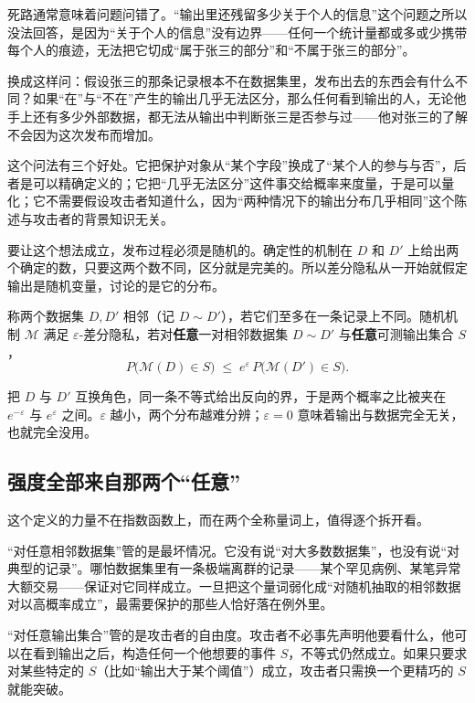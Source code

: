死路通常意味着问题问错了。``输出里还残留多少关于个人的信息''这个问题之所以没法回答，是因为``关于个人的信息''没有边界——任何一个统计量都或多或少携带每个人的痕迹，无法把它切成``属于张三的部分''和``不属于张三的部分''。

换成这样问：假设张三的那条记录根本不在数据集里，发布出去的东西会有什么不同？如果``在''与``不在''产生的输出几乎无法区分，那么任何看到输出的人，无论他手上还有多少外部数据，都无法从输出中判断张三是否参与过——他对张三的了解不会因为这次发布而增加。

这个问法有三个好处。它把保护对象从``某个字段''换成了``某个人的参与与否''，后者是可以精确定义的；它把``几乎无法区分''这件事交给概率来度量，于是可以量化；它不需要假设攻击者知道什么，因为``两种情况下的输出分布几乎相同''这个陈述与攻击者的背景知识无关。

要让这个想法成立，发布过程必须是随机的。确定性的机制在 \(D\) 和 \(D'\) 上给出两个确定的数，只要这两个数不同，区分就是完美的。所以差分隐私从一开始就假定输出是随机变量，讨论的是它的分布。

\begin{definition}
称两个数据集 \(D,D'\) 相邻（记 \(D\sim D'\)），若它们至多在一条记录上不同。随机机制 \(\mathcal M\) 满足 \(\varepsilon\)-差分隐私，若对\textbf{任意}一对相邻数据集 \(D\sim D'\) 与\textbf{任意}可测输出集合 \(S\)，
\[
P\big(\mathcal M(D)\in S\big)\;\le\;e^{\varepsilon}\,P\big(\mathcal M(D')\in S\big).
\]
\end{definition}

把 \(D\) 与 \(D'\) 互换角色，同一条不等式给出反向的界，于是两个概率之比被夹在 \(e^{-\varepsilon}\) 与 \(e^{\varepsilon}\) 之间。\(\varepsilon\) 越小，两个分布越难分辨；\(\varepsilon=0\) 意味着输出与数据完全无关，也就完全没用。

\subsection{强度全部来自那两个``任意''}

这个定义的力量不在指数函数上，而在两个全称量词上，值得逐个拆开看。

``对任意相邻数据集''管的是最坏情况。它没有说``对大多数数据集''，也没有说``对典型的记录''。哪怕数据集里有一条极端离群的记录——某个罕见病例、某笔异常大额交易——保证对它同样成立。一旦把这个量词弱化成``对随机抽取的相邻数据对以高概率成立''，最需要保护的那些人恰好落在例外里。

``对任意输出集合''管的是攻击者的自由度。攻击者不必事先声明他要看什么，他可以在看到输出之后，构造任何一个他想要的事件 \(S\)，不等式仍然成立。如果只要求对某些特定的 \(S\)（比如``输出大于某个阈值''）成立，攻击者只需换一个更精巧的 \(S\) 就能突破。

